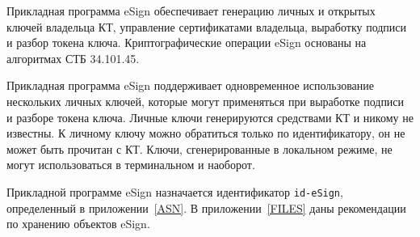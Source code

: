Прикладная программа eSign обеспечивает генерацию личных и открытых 
ключей владельца КТ, управление сертификатами владельца, 
выработку подписи и разбор токена ключа.
%
Криптографические операции eSign основаны на алгоритмах СТБ 34.101.45.


Прикладная программа eSign поддерживает одновременное 
использование нескольких личных ключей, 
которые могут применяться при выработке подписи и разборе токена ключа.
Личные ключи генерируются средствами КТ и никому не известны. 
К личному ключу можно обратиться только по идентификатору, 
он не может быть прочитан с КТ. 
Ключи, сгенерированные в локальном режиме, не могут использоваться 
в терминальном и наоборот.
\fi

Прикладной программе eSign назначается идентификатор \verb|id-eSign|, 
определенный в приложении~\ref{ASN}. В приложении~\ref{FILES}
даны рекомендации по хранению объектов eSign.


